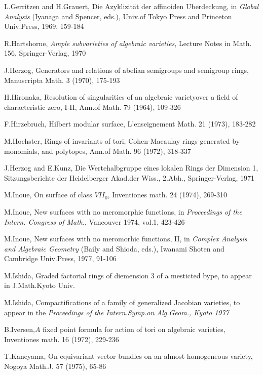 \begin{thebibliography}{99}
 {L.Gerritzen and H.Grauert}, Die Azyklizit\"at der
  affinoiden Uberdeckung, in \textit{Global Analysis} (Iyanaga and
  Spencer, eds.), Univ.of Tokyo Press and Princeton Univ.Press,
1969,  159-184 

 {R.Hartshorne}, \textit{Ample subvarieties of algebraic
  varieties}, Lecture Notes in Math. 156, Springer-Verlag, 1970
 
 {J.Herzog}, Generators and relations of abelian semigroups
  and semigroup rings, Manuscripta Math. 3 (1970), 175-193
 
 {H.Hironaka}, Resolution of singularities of an algebraic
  variety\pageoriginale over a field of characteristic zero, I-II,
  Ann.of Math. 79 (1964), 109-326  

 {F.Hirzebruch}, Hilbert modular surface, L'enseignement
  Math. 21 (1973), 183-282 

 {M.Hochster}, Rings of invariants of tori, Cohen-Macaulay
  rings generated by monomials, and polytopes, Ann.of  Math. 96 
  (1972), 318-337
 
 {J.Herzog and E.Kunz}, Die Wertehalbgruppe eines lokalen
  Rings der Dimension 1, Sitzungsberichte der Heidelberger Akad.der
  Wiss., 2.Abh., Springer-Verlag, 1971 

 {M.Inoue}, On surface of class $VII_0$, Inventiones math.
  24 (1974), 269-310
 
 {M.Inoue}, New surfaces with no meromorphic functions, in
  \textit{Proceedings of the  Intern. Congress of Math}., Vancouver
 1974,  vol.1, 423-426 

 {M.Inoue}, New surfaces with no meromorhic functions,
  II, in \textit{Complex Analysis and Algebraic Geometry} (Baily
  and Shioda, eds.), Iwanami Shoten and Cambridge Univ.Press, 1977,
  91-106 

 {M.Ishida}, Graded factorial rings of diemension 3 of a
  mesticted bype, to appear in J.Math.Kyoto Univ.
 
 {M.Ishida}, Compactifications of a family of generalized
  Jacobian varieties, to appear in the \textit{Proceedings of  the
    Intern.Symp.on Alg.Geom., Kyoto 1977}
 
 {B.Iversen,}\pageoriginale $A$ fixed point formula for
  action of tori on algebraic varieties, Inventiones math. 16
  (1972), 229-236  
 
 {T.Kaneyama,} On equivariant vector bundles on an almost
  homogeneous variety, Nogoya Math.J. 57 (1975), 65-86 
 

\end{thebibliography}
